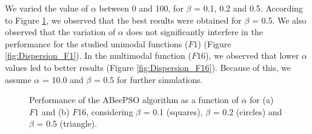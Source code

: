 We varied the value of $\alpha$ between 0 and 100, for $\beta$ = 0.1, 0.2 and 0.5. According to Figure \ref{fig:Dispersion_Step}, we observed that the best results were obtained for $\beta$ = 0.5. We also observed that the variation of $\alpha$ does not significantly interfere in the performance for the studied unimodal functions ($F1$) (Figure \ref{fig:Dispersion_F1}). In the multimodal function ($F16$), we observed that lower $\alpha$ values led to better results (Figure \ref{fig:Dispersion_F16}). Because of this, we assume $\alpha$ = 10.0 and $\beta$ = 0.5 for further simulations.

\begin{figure}[!h]
\centering
{}
\hspace{1mm}
\caption{\small{Performance of the ABeePSO algorithm as a function of $\alpha$ for (a) $F1$ and (b) $F16$, considering $\beta$ = 0.1 (squares), $\beta$ = 0.2 (circles) and $\beta$ = 0.5 (triangle).}}
\label{fig:Dispersion_Step}
\end{figure}

